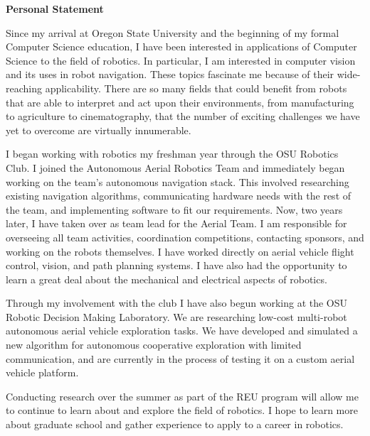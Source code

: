 \documentclass[12pt,letterpaper]{article}
\begin{document}
{\Large\center\textbf{Personal Statement} \\}

\vspace{2mm}

Since my arrival at Oregon State University and the beginning of my formal
Computer Science education, I have been interested in applications of Computer
Science to the field of robotics. In particular, I am interested in computer
vision and its uses in robot navigation. These topics fascinate me because of
their wide-reaching applicability. There are so many fields that could benefit
from robots that are able to interpret and act upon their environments, from
manufacturing to agriculture to cinematography, that the number of exciting
challenges we have yet to overcome are virtually innumerable.

I began working with robotics my freshman year through the OSU Robotics Club. I
joined the Autonomous Aerial Robotics Team and immediately began working on the
team's autonomous navigation stack. This involved researching existing
navigation algorithms, communicating hardware needs with the rest of the team,
and implementing software to fit our requirements. Now, two years later, I have
taken over as team lead for the Aerial Team. I am responsible for overseeing all
team activities, coordination competitions, contacting sponsors, and working on
the robots themselves. I have worked directly on aerial vehicle flight control,
vision, and path planning systems. I have also had the opportunity to learn a
great deal about the mechanical and electrical aspects of robotics.

Through my involvement with the club I have also begun working at the OSU
Robotic Decision Making Laboratory. We are researching low-cost multi-robot
autonomous aerial vehicle exploration tasks. We have developed and simulated a
new algorithm for autonomous cooperative exploration with limited communication,
and are currently in the process of testing it on a custom aerial vehicle
platform.

Conducting research over the summer as part of the REU program will allow me to
continue to learn about and explore the field of robotics. I hope to learn more
about graduate school and gather experience to apply to a career in robotics.
\end{document}
